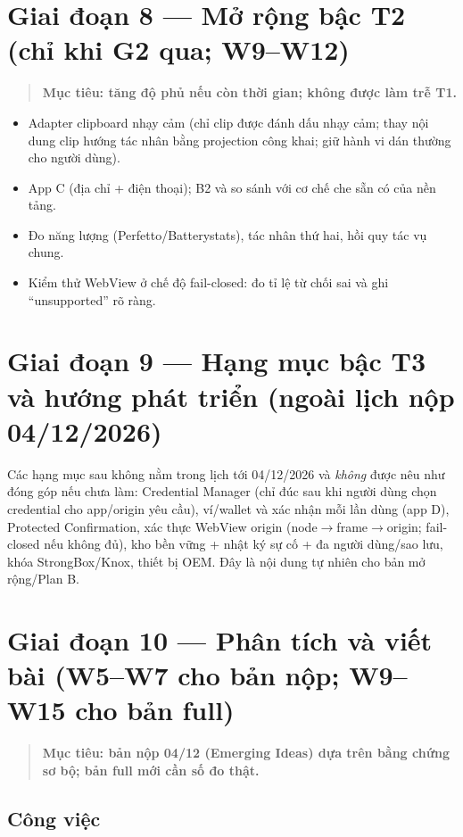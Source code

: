 \documentclass[11pt,a4paper]{article}
\newenvironment{phasebox}
  {\begin{quote}\color{shblue}\bfseries}
  {\end{quote}}
\begin{document}
\section{Giai đoạn 8 --- Mở rộng bậc T2 (chỉ khi G2 qua; W9--W12)}

\begin{phasebox}Mục tiêu: tăng độ phủ nếu còn thời gian; không được làm trễ T1.\end{phasebox}

\begin{itemize}
  \item Adapter clipboard nhạy cảm (chỉ clip được đánh dấu nhạy cảm; thay nội dung clip hướng tác nhân bằng projection công khai; giữ hành vi dán thường cho người dùng).
  \item App C (địa chỉ + điện thoại); B2 và so sánh với cơ chế che sẵn có của nền tảng.
  \item Đo năng lượng (Perfetto/Batterystats), tác nhân thứ hai, hồi quy tác vụ chung.
  \item Kiểm thử WebView ở chế độ fail-closed: đo tỉ lệ từ chối sai và ghi ``unsupported'' rõ ràng.
\end{itemize}

\section{Giai đoạn 9 --- Hạng mục bậc T3 và hướng phát triển (ngoài lịch nộp 04/12/2026)}

Các hạng mục sau không nằm trong lịch tới 04/12/2026 và \emph{không} được nêu như đóng góp nếu chưa làm: Credential Manager (chỉ đúc sau khi người dùng chọn credential cho app/origin yêu cầu),
ví/wallet và xác nhận mỗi lần dùng (app D), Protected Confirmation, xác thực WebView origin (node$\to$frame$\to$origin; fail-closed nếu không đủ), kho bền vững + nhật ký sự cố + đa người dùng/sao lưu,
khóa StrongBox/Knox, thiết bị OEM. Đây là nội dung tự nhiên cho bản mở rộng/Plan B.

\section{Giai đoạn 10 --- Phân tích và viết bài (W5--W7 cho bản nộp; W9--W15 cho bản full)}

\begin{phasebox}Mục tiêu: bản nộp 04/12 (Emerging Ideas) dựa trên bằng chứng sơ bộ; bản full mới cần số đo thật.\end{phasebox}

\subsection{Công việc}
\end{document}
